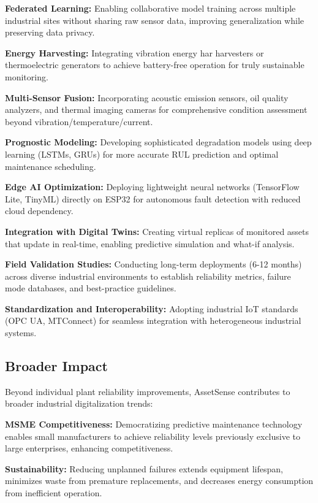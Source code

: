 \documentclass[conference]{IEEEtran}
\begin{document}
\textbf{Federated Learning:} Enabling collaborative model training across multiple industrial sites without sharing raw sensor data, improving generalization while preserving data privacy.

\textbf{Energy Harvesting:} Integrating vibration energy har harvesters or thermoelectric generators to achieve battery-free operation for truly sustainable monitoring.

\textbf{Multi-Sensor Fusion:} Incorporating acoustic emission sensors, oil quality analyzers, and thermal imaging cameras for comprehensive condition assessment beyond vibration/temperature/current.

\textbf{Prognostic Modeling:} Developing sophisticated degradation models using deep learning (LSTMs, GRUs) for more accurate RUL prediction and optimal maintenance scheduling.

\textbf{Edge AI Optimization:} Deploying lightweight neural networks (TensorFlow Lite, TinyML) directly on ESP32 for autonomous fault detection with reduced cloud dependency.

\textbf{Integration with Digital Twins:} Creating virtual replicas of monitored assets that update in real-time, enabling predictive simulation and what-if analysis.

\textbf{Field Validation Studies:} Conducting long-term deployments (6-12 months) across diverse industrial environments to establish reliability metrics, failure mode databases, and best-practice guidelines.

\textbf{Standardization and Interoperability:} Adopting industrial IoT standards (OPC UA, MTConnect) for seamless integration with heterogeneous industrial systems.

\subsection{Broader Impact}

Beyond individual plant reliability improvements, AssetSense contributes to broader industrial digitalization trends:

\textbf{MSME Competitiveness:} Democratizing predictive maintenance technology enables small manufacturers to achieve reliability levels previously exclusive to large enterprises, enhancing competitiveness.

\textbf{Sustainability:} Reducing unplanned failures extends equipment lifespan, minimizes waste from premature replacements, and decreases energy consumption from inefficient operation.
\end{document}
